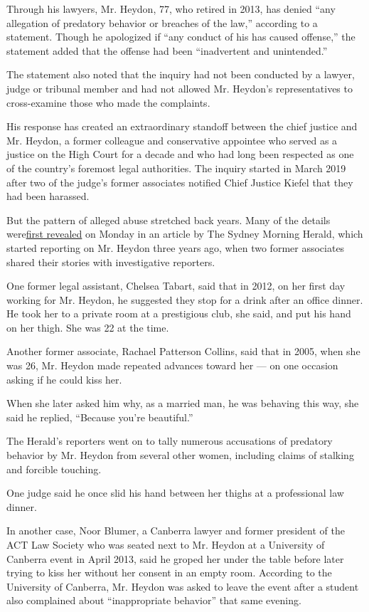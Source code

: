 Through his lawyers, Mr. Heydon, 77, who retired in 2013, has denied
``any allegation of predatory behavior or breaches of the law,''
according to a statement. Though he apologized if ``any conduct of his
has caused offense,'' the statement added that the offense had been
``inadvertent and unintended.''

The statement also noted that the inquiry had not been conducted by a
lawyer, judge or tribunal member and had not allowed Mr. Heydon's
representatives to cross-examine those who made the complaints.

His response has created an extraordinary standoff between the chief
justice and Mr. Heydon, a former colleague and conservative appointee
who served as a justice on the High Court for a decade and who had long
been respected as one of the country's foremost legal authorities. The
inquiry started in March 2019 after two of the judge's former associates
notified Chief Justice Kiefel that they had been harassed.

But the pattern of alleged abuse stretched back years. Many of the
details
were\href{https://www.smh.com.au/national/high-court-inquiry-finds-former-justice-dyson-heydon-sexually-harassed-associates-20200622-p5550w.html}{first
revealed} on Monday in an article by The Sydney Morning Herald, which
started reporting on Mr. Heydon three years ago, when two former
associates shared their stories with investigative reporters.

One former legal assistant, Chelsea Tabart, said that in 2012, on her
first day working for Mr. Heydon, he suggested they stop for a drink
after an office dinner. He took her to a private room at a prestigious
club, she said, and put his hand on her thigh. She was 22 at the time.

Another former associate, Rachael Patterson Collins, said that in 2005,
when she was 26, Mr. Heydon made repeated advances toward her --- on one
occasion asking if he could kiss her.

When she later asked him why, as a married man, he was behaving this
way, she said he replied, ``Because you're beautiful.''

The Herald's reporters went on to tally numerous accusations of
predatory behavior by Mr. Heydon from several other women, including
claims of stalking and forcible touching.

One judge said he once slid his hand between her thighs at a
professional law dinner.

In another case, Noor Blumer, a Canberra lawyer and former president of
the ACT Law Society who was seated next to Mr. Heydon at a University of
Canberra event in April 2013, said he groped her under the table before
later trying to kiss her without her consent in an empty room. According
to the University of Canberra, Mr. Heydon was asked to leave the event
after a student also complained about ``inappropriate behavior'' that
same evening.

